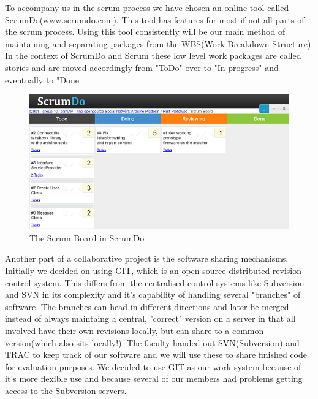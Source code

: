 To accompany us in the scrum process we have chosen an online tool called ScrumDo(www.scrumdo.com). This tool has features for most if not all parts of the scrum process. Using this tool consistently will be our main method of maintaining and separating packages from the WBS(Work Breakdown Structure). In the context of ScrumDo and Scrum these low level work packages are called stories and are moved accordingly from "ToDo" over to "In progress" and eventually to "Done


\begin{figure}
	\centering
	\includegraphics{./img/management-scrumdo.png}
	\caption{The Scrum Board in ScrumDo}
	\label{fig:management-scrumdo}
\end{figure}





Another part of a collaborative project is the software sharing mechanisms. Initially we decided on using GIT, which is an open source distributed revision control system. This differs from the centralised control systems like Subversion and SVN in its complexity and it's capability of handling several "branches" of software. The branches can head in different directions and later be merged instead of always maintaing a central, "correct" version on a server in that all involved have their own revisions locally, but can share to a common version(which also sits locally!). The faculty handed out SVN(Subversion) and TRAC to keep track of our software and we will use these to share finished code for evaluation purposes. We decided to use GIT as our work system because of it's more flexible use and because several of our members had problems getting access to the Subversion servers. 





